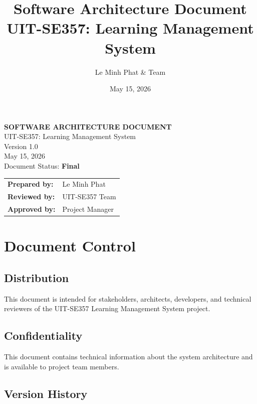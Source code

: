 \documentclass[12pt,oneside,a4paper]{article}
\title{\textbf{Software Architecture Document}\\
UIT-SE357: Learning Management System}
\author{Le Minh Phat \& Team}
\date{May 15, 2026}
\begin{document}
\begin{titlepage}
    \begin{center}
        \vspace*{2cm}
        {\LARGE \textbf{SOFTWARE ARCHITECTURE DOCUMENT}}\\
        \vspace{0.5cm}
        {\large UIT-SE357: Learning Management System}\\
        \vspace{3cm}
        {\large Version 1.0}\\
        \vspace{0.5cm}
        {\large May 15, 2026}\\
        \vspace{3cm}
        Document Status: \textbf{Final}\\
        \vspace{2cm}
        \small
        \begin{tabularx}{\textwidth}{lX}
            \textbf{Prepared by:} & Le Minh Phat \\
            \textbf{Reviewed by:} & UIT-SE357 Team \\
            \textbf{Approved by:} & Project Manager \\
        \end{tabularx}
        \vfill
    \end{center}
\end{titlepage}

\section*{Document Control}

\subsection*{Distribution}
This document is intended for stakeholders, architects, developers, and technical reviewers of the UIT-SE357 Learning Management System project.

\subsection*{Confidentiality}
This document contains technical information about the system architecture and is available to project team members.

\subsection*{Version History}
\end{document}
